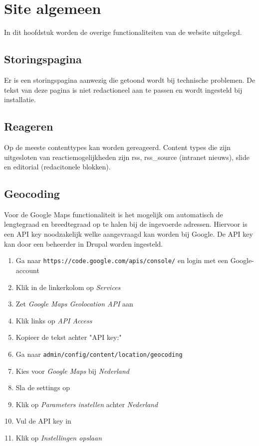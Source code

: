 
\section{Site algemeen}\label{sitealgemeen}
In dit hoofdstuk worden de overige functionaliteiten van de website uitgelegd.








\subsection{Storingspagina}

Er is een storingspagina aanwezig die getoond wordt bij technische problemen. De tekst van deze pagina is niet redactioneel aan te passen en wordt ingesteld bij installatie.

\subsection{Reageren}

Op de meeste contenttypes kan worden gereageerd. Content types die zijn uitgesloten van reactiemogelijkheden zijn rss, rss\_source (intranet nieuws), slide en editorial (redacitonele blokken).

\subsection{Geocoding}\label{geocoding}

Voor de Google Maps functionaliteit is het mogelijk om automatisch de lengtegraad en breedtegraad op te halen bij de ingevoerde adressen. Hiervoor is een API key noodzakelijk welke aangevraagd kan worden bij Google. De API key kan door een beheerder in Drupal worden ingesteld.
\begin{enumerate}
\item Ga naar \texttt{https://code.google.com/apis/console/} en login met een Google-account
\item Klik in de linkerkolom op \emph{Services}
\item Zet \emph{Google Maps Geolocation API} aan
\item Klik links op \emph{API Access}
\item Kopieer de tekst achter "API key:"
\item Ga naar \texttt{admin/config/content/location/geocoding}
\item Kies voor \emph{Google Maps} bij \emph{Nederland}
\item Sla de settings op
\item Klik op \emph{Parameters instellen} achter \emph{Nederland}
\item Vul de API key in
\item Klik op \emph{Instellingen opslaan}
\end{enumerate}
